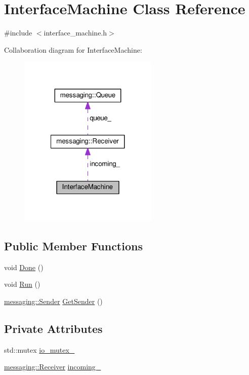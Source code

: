\hypertarget{classInterfaceMachine}{\section{Interface\-Machine Class Reference}
\label{classInterfaceMachine}
}


{\ttfamily \#include $<$interface\-\_\-machine.\-h$>$}



Collaboration diagram for Interface\-Machine\-:
\nopagebreak
\begin{figure}[H]
\begin{center}
\leavevmode
\includegraphics[width=188pt]{classInterfaceMachine__coll__graph}
\end{center}
\end{figure}
\subsection*{Public Member Functions}
\begin{DoxyCompactItemize}
\item 
void \hyperlink{classInterfaceMachine_acfe81f2fdc61f1136d754b8f239e57ea}{Done} ()
\item 
void \hyperlink{classInterfaceMachine_a046f9d3bb23bf7e0b53e68ad152d755d}{Run} ()
\item 
\hyperlink{classmessaging_1_1Sender}{messaging\-::\-Sender} \hyperlink{classInterfaceMachine_a9b431c811e91a9a33254151b1734fd3a}{Get\-Sender} ()
\end{DoxyCompactItemize}
\subsection*{Private Attributes}
\begin{DoxyCompactItemize}
\item 
std\-::mutex \hyperlink{classInterfaceMachine_a00f26d214b26780bca26e8033d2d4921}{io\-\_\-mutex\-\_\-}
\item 
\hyperlink{classmessaging_1_1Receiver}{messaging\-::\-Receiver} \hyperlink{classInterfaceMachine_a9a6baaba223e2a23ead6e80d25c02c59}{incoming\-\_\-}
\end{DoxyCompactItemize}



